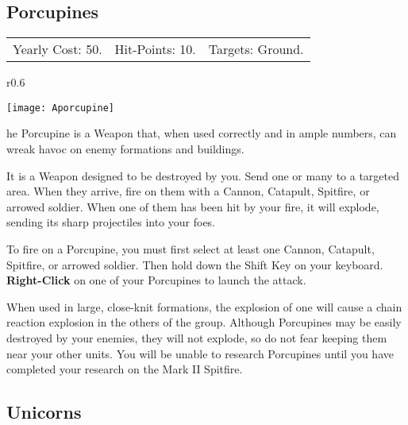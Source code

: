 \clearpage

\subsection{Porcupines}


\begin{tabular}{p{1.264in} p{1.264in} p{1.264in}}
Yearly Cost: 50. & Hit-Points: 10. & Targets: Ground.
\end{tabular}

\begin{wrapfigure}{r}{0.6\textwidth}
	\vspace{-20pt}
	\begin{center}
		\texttt{[image: Aporcupine]} %
	\end{center}
	\vspace{-20pt}
\end{wrapfigure}

he Porcupine is a Weapon that, when used correctly and in ample numbers, can wreak havoc on enemy formations and buildings.

It is a Weapon designed to be destroyed by you. Send one or many to a targeted area. When they arrive, fire on them with a Cannon, Catapult, Spitfire, or arrowed soldier. When one of them has been hit by your fire, it will explode, sending its sharp projectiles into your foes.


To fire on a Porcupine, you must first select at least one Cannon, Catapult, Spitfire, or arrowed soldier. Then hold down the Shift Key on your keyboard. \textbf{Right-Click} on one of your Porcupines to launch the attack.


When used in large, close-knit formations, the explosion of one will cause a chain reaction explosion in the others of the group. Although Porcupines may be easily destroyed by your enemies, they will not explode, so do not fear keeping them near your other units. You will be unable to research Porcupines until you have completed your research on the Mark II Spitfire.

\clearpage

\subsection{Unicorns}

